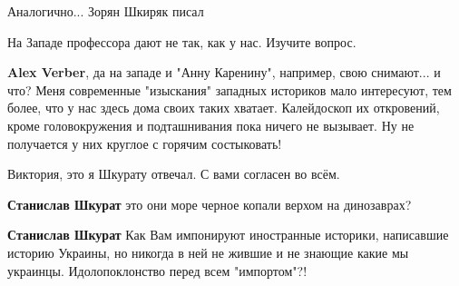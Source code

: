 \begin{itemize}
\begin{itemize}
Аналогично... Зорян Шкиряк писал

 
На Западе профессора дают не так, как у нас. Изучите вопрос.

 
\textbf{Alex Verber}, да на западе и "Анну Каренину", например, свою снимают... и что? Меня современные "изыскания" западных историков мало интересуют, тем более, что у нас здесь дома своих таких хватает. Калейдоскоп их откровений, кроме головокружения и подташнивания пока ничего не вызывает. Ну не получается у них круглое с горячим состыковать!

 
Виктория, это я Шкурату отвечал. С вами согласен во всём.

 
\textbf{Станислав Шкурат} это они море черное копали верхом на динозаврах?

 
\textbf{Станислав Шкурат}
Как Вам импонируют иностранные историки, написавшие историю Украины, но никогда в ней не жившие и не знающие какие мы украинцы. Идолопоклонство перед всем "импортом"?!

 

\end{itemize}
\end{itemize}
